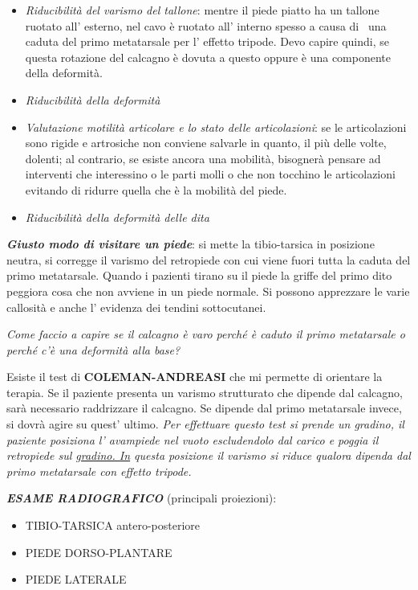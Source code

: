 \documentclass[]{article}
\begin{document}
\begin{itemize}
\item
  \emph{Riducibilità del varismo del tallone}: mentre il piede piatto ha
  un tallone ruotato all' esterno, nel cavo è ruotato all' interno
  spesso a causa di ~una caduta del primo metatarsale per l' effetto
  tripode. Devo capire quindi, se questa rotazione del calcagno è dovuta
  a questo oppure è una componente della deformità.
\item
  \emph{Riducibilità della deformità}
\item
  \emph{Valutazione motilità articolare e lo stato delle articolazioni}:
  se le articolazioni sono rigide e artrosiche non conviene salvarle in
  quanto, il più delle volte, dolenti; al contrario, se esiste ancora
  una mobilità, bisognerà pensare ad interventi che interessino o le
  parti molli o che non tocchino le articolazioni evitando di ridurre
  quella che è la mobilità del piede.
\item
  \emph{Riducibilità della deformità delle dita}
\end{itemize}

\emph{\textbf{Giusto modo di visitare un piede}}: si mette la
tibio-tarsica in posizione neutra, si corregge il varismo del retropiede
con cui viene fuori tutta la caduta del primo metatarsale. Quando i
pazienti tirano su il piede la griffe del primo dito peggiora cosa che
non avviene in un piede normale. Si possono apprezzare le varie
callosità e anche l' evidenza dei tendini sottocutanei.

\emph{Come faccio a capire se il calcagno è varo perché è caduto il
primo metatarsale o perché c'è una deformità alla base?}

Esiste il test di \textbf{COLEMAN-ANDREASI} che mi permette di orientare
la terapia. Se il paziente presenta un varismo strutturato che dipende
dal calcagno, sarà necessario raddrizzare il calcagno. Se dipende dal
primo metatarsale invece, si dovrà agire su quest' ultimo. \emph{Per
effettuare questo test si prende un gradino, il paziente posiziona l'
avampiede nel vuoto escludendolo dal carico e poggia il retropiede sul
\href{http://gradino.in/}{gradino. In} questa posizione il varismo si
riduce qualora dipenda dal primo metatarsale con effetto tripode.}

\emph{\textbf{ESAME RADIOGRAFICO}} (principali proiezioni):

\begin{itemize}
\item
  TIBIO-TARSICA antero-posteriore
\item
  PIEDE DORSO-PLANTARE
\item
  PIEDE LATERALE
\end{itemize}
\end{document}
